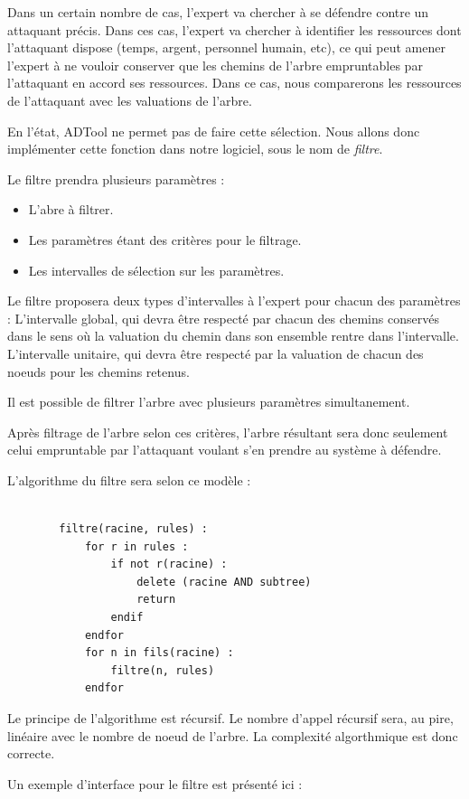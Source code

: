 		Dans un certain nombre de cas, l'expert va chercher à se défendre contre un attaquant précis. Dans ces cas, l'expert va chercher à identifier les ressources dont l'attaquant dispose (temps, argent, personnel humain, etc), ce qui peut amener l'expert à ne vouloir conserver que les chemins de l'arbre empruntables par 				l'attaquant en accord ses ressources. Dans ce cas, nous comparerons les ressources de l'attaquant avec les valuations de l'arbre.

		En l'état, ADTool ne permet pas de faire cette sélection. Nous allons donc implémenter cette fonction dans notre logiciel, sous le nom de \textit{filtre}.

		Le filtre prendra plusieurs paramètres :
		\begin{itemize}
		\item L'abre à filtrer.
		\item Les paramètres étant des critères pour le filtrage.
		\item Les intervalles de sélection sur les paramètres.
		\end{itemize}

		Le filtre proposera deux types d'intervalles à l'expert pour chacun des paramètres : 
		L'intervalle global, qui devra être respecté par chacun des chemins conservés dans le sens où la valuation du chemin dans son ensemble rentre dans l'intervalle.
		L'intervalle unitaire, qui devra être respecté par la valuation de chacun des noeuds pour les chemins retenus.

		Il est possible de filtrer l'arbre avec plusieurs paramètres simultanement.
		
		Après filtrage de l'arbre selon ces critères, l'arbre résultant sera donc seulement celui empruntable par l'attaquant voulant s'en prendre au système à défendre. 
		
		L'algorithme du filtre sera selon ce modèle :

		\begin{lstlisting}

		filtre(racine, rules) :
			for r in rules :
				if not r(racine) :
					delete (racine AND subtree)
					return
				endif
			endfor
			for n in fils(racine) :
				filtre(n, rules)
			endfor
		\end{lstlisting}
	
		Le principe de l'algorithme est récursif.
		Le nombre d'appel récursif sera, au pire, linéaire avec le nombre de noeud de l'arbre.
		La complexité algorthmique est donc correcte.

		Un exemple d'interface pour le filtre est présenté ici :

